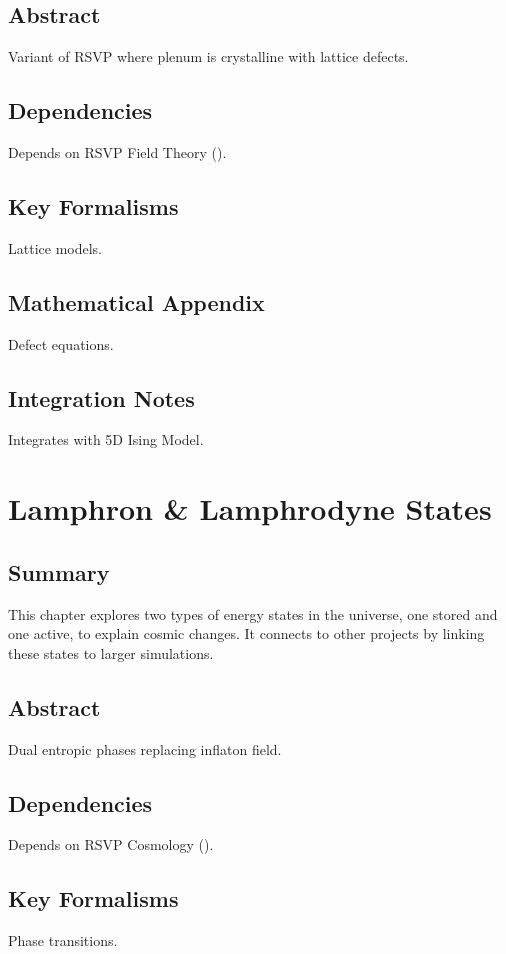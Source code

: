 \documentclass[11pt,oneside]{memoir}
\theoremstyle{plain}
\begin{document}
\section{Abstract}
Variant of RSVP where plenum is crystalline with lattice defects.

\section{Dependencies}
Depends on RSVP Field Theory ().

\section{Key Formalisms}
Lattice models.

\section{Mathematical Appendix}
Defect equations.

\section{Integration Notes}
Integrates with 5D Ising Model.

\chapter{Lamphron \& Lamphrodyne States}
\label{sec:lamphron_lamphrodyne}
\section{Summary}
This chapter explores two types of energy states in the universe, one stored and one active, to explain cosmic changes. It connects to other projects by linking these states to larger simulations.

\section{Abstract}
Dual entropic phases replacing inflaton field.

\section{Dependencies}
Depends on RSVP Cosmology ().

\section{Key Formalisms}
Phase transitions.
\end{document}
